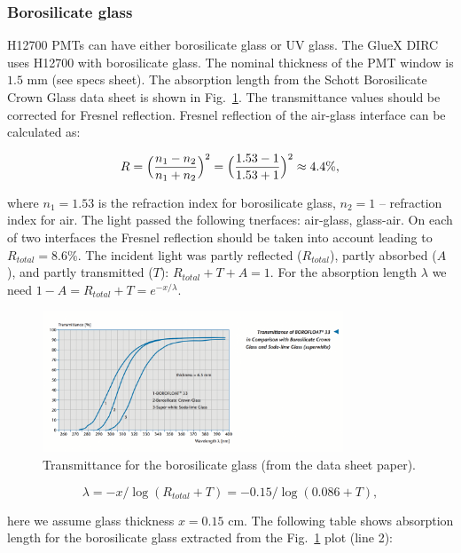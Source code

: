 \subsubsection*{Borosilicate glass}

H12700 PMTs can have either borosilicate glass or UV glass. The GlueX DIRC uses H12700 with borosilicate glass. The nominal thickness of the PMT window is $1.5$ mm (see specs sheet). The absorption length from the Schott Borosilicate Crown Glass data sheet is shown in Fig.~\ref{pic:gla}. The transmittance values should be corrected for Fresnel reflection. Fresnel reflection of the air-glass interface can be calculated as:

\begin{equation}
R = \Bigl( \frac{n_1 - n_2}{n_1 + n_2} \Bigr)^{2} = \Bigl( \frac{1.53 - 1}{1.53 + 1} \Bigr) ^{2} \approx 4.4\%,
\label{eq:fre}
\end{equation}

\noindent where $n_1 = 1.53$ is the refraction index for borosilicate glass, $n_2 = 1$ -- refraction index for air. The light passed the following tnerfaces: air-glass, glass-air. On each of two interfaces the Fresnel reflection should be taken into account leading to $R_{total} = 8.6\%$. The incident light was partly reflected ($R_{total}$), partly absorbed ($A$), and partly transmitted ($T$): $ R_{total} + T + A = 1$. For the absorption length $\lambda$ we need $1 - A = R_{total} + T = e^{-x/\lambda}$. 

\begin{figure}[htb]
\centering
\includegraphics[angle=0,width=0.8\textwidth]{pics/glass.png}
\caption{\label{pic:gla}
Transmittance for the borosilicate glass (from the data sheet paper).
}
\end{figure}

\begin{equation}
\lambda = -x/\log(R_{total}+T) = -0.15/\log(0.086+T),
\label{eq:lam}
\end{equation}

\noindent here we assume glass thickness $x = 0.15$ cm. The following table shows absorption length for the borosilicate glass extracted from the Fig.~\ref{pic:gla} plot (line 2):


